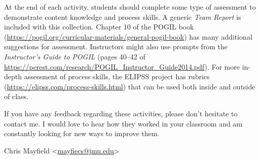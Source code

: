 \bigskip

At the end of each activity, students should complete some type of assessment to demonstrate content knowledge and process skills. A generic \textit{Team Report} is included with this collection. Chapter 10 of the POGIL book (\url{https://pogil.org/curricular-materials/general-pogil-book}) has many additional suggestions for assessment. Instructors might also use prompts from the \textit{Instructor's Guide to POGIL} (pages 40--42 of \url{https://pcrest.com/research/POGIL_Instructor_Guide2014.pdf}). For more in-depth assessment of process skills, the ELIPSS project has rubrics (\url{https://elipss.com/process-skills.html}) that can be used both inside and outside of class.

\bigskip

If you have any feedback regarding these activities, please don't hesitate to contact me. I would love to hear how they worked in your classroom and am constantly looking for new ways to improve them.

\bigskip

\newcommand{\email}[1]{<\href{mailto:#1}{#1}>}

Chris Mayfield \email{mayfiecs@jmu.edu}
